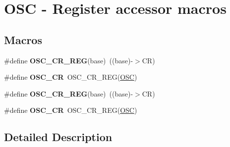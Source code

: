 \hypertarget{group__OSC__Register__Accessor__Macros}{}\section{O\+SC -\/ Register accessor macros}
\label{group__OSC__Register__Accessor__Macros}
\subsection*{Macros}
\begin{DoxyCompactItemize}
\item 
\#define {\bfseries O\+S\+C\+\_\+\+C\+R\+\_\+\+R\+EG}(base)~((base)-\/$>$CR)\hypertarget{group__OSC__Register__Accessor__Macros_gabcb7eab28c1f1c1d2b742a84f826de10}{}\label{group__OSC__Register__Accessor__Macros_gabcb7eab28c1f1c1d2b742a84f826de10}

\item 
\#define {\bfseries O\+S\+C\+\_\+\+CR}~O\+S\+C\+\_\+\+C\+R\+\_\+\+R\+EG(\hyperlink{group__OSC__Peripheral__Access__Layer_gac9fd21467d416baa7f6aa4c175f8c6b5}{O\+SC})\hypertarget{group__OSC__Register__Accessor__Macros_ga4361def829ba760e782fbd2f74eb0e19}{}\label{group__OSC__Register__Accessor__Macros_ga4361def829ba760e782fbd2f74eb0e19}

\item 
\#define {\bfseries O\+S\+C\+\_\+\+C\+R\+\_\+\+R\+EG}(base)~((base)-\/$>$CR)\hypertarget{group__OSC__Register__Accessor__Macros_gabcb7eab28c1f1c1d2b742a84f826de10}{}\label{group__OSC__Register__Accessor__Macros_gabcb7eab28c1f1c1d2b742a84f826de10}

\item 
\#define {\bfseries O\+S\+C\+\_\+\+CR}~O\+S\+C\+\_\+\+C\+R\+\_\+\+R\+EG(\hyperlink{group__OSC__Peripheral__Access__Layer_gac9fd21467d416baa7f6aa4c175f8c6b5}{O\+SC})\hypertarget{group__OSC__Register__Accessor__Macros_ga4361def829ba760e782fbd2f74eb0e19}{}\label{group__OSC__Register__Accessor__Macros_ga4361def829ba760e782fbd2f74eb0e19}

\end{DoxyCompactItemize}


\subsection{Detailed Description}
